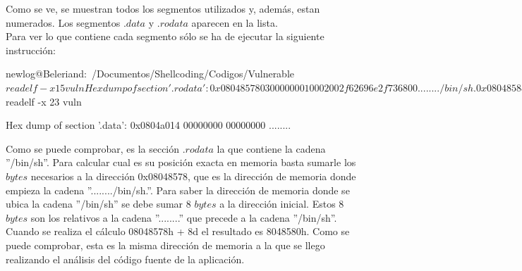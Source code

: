 \documentclass [titlepage, 12pt]{article}
\begin{document}

Como se ve, se muestran todos los segmentos utilizados y, adem\'as, estan numerados. Los segmentos $.data$ y $.rodata$ aparecen en la lista.\\
Para ver lo que contiene cada segmento s\'olo se ha de ejecutar la siguiente instrucci\'on:

\begin{listing}[style=consola, numbers=none, caption=Segmento .data y .rodata]	
newlog@Beleriand:~/Documentos/Shellcoding/Codigos/Vulnerable$ readelf -x 15 vuln

Hex dump of section '.rodata':
  0x08048578 03000000 01000200 2f62696e 2f736800 ......../bin/sh.
  0x08048588 257300                              %

newlog@Beleriand:~/Documentos/Shellcoding/Codigos/Vulnerable$ readelf -x 23 vuln

Hex dump of section '.data':
  0x0804a014 00000000 00000000                   ........

\end{listing}

Como se puede comprobar, es la secci\'on .$rodata$ la que contiene la cadena ''/bin/sh''. Para calcular cual es su posici\'on exacta en memoria basta sumarle los $bytes$ necesarios a la direcci\'on 0x08048578, que es la direcci\'on de memoria donde empieza la cadena ''......../bin/sh.''. Para saber la direcci\'on de memoria donde se ubica la cadena ''/bin/sh'' se debe sumar 8 $bytes$ a la direcci\'on inicial. Estos 8 $bytes$ son los relativos a la cadena ''........'' que precede a la cadena ''/bin/sh''. Cuando se realiza el c\'alculo 08048578h + 8d el resultado es 8048580h. Como se puede comprobar, esta es la misma direcci\'on de memoria a la que se llego realizando el an\'alisis del c\'odigo fuente de la aplicaci\'on.
\end{document}
